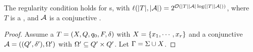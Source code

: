 \begin{lemma}\label{lem-2pt}
The  regularity condition  \prerec{} holds for \PPT{}s, with $\ell(|T|, |\mathcal{A}|) = 2^{\mathcal{O}(|T||\mathcal{A}|\log (|T||\mathcal{A}|))}$, where $T$ is a  \PPT{}, and $\mathcal{A}$ is a conjunctive  \FFA{}. 
\end{lemma}

\begin{proof}
Assume a \PPT{} $T=(X, Q, q_0, F, \delta)$ with $X = \{x_1,\cdots, x_r\}$ and a conjunctive \FA{} $\mathcal{A} = ((Q', \delta'), \Omega')$ with $\Omega' \subseteq Q' \times Q'$. %
Let $\Gamma = \Sigma \cup X$.


\end{proof}
